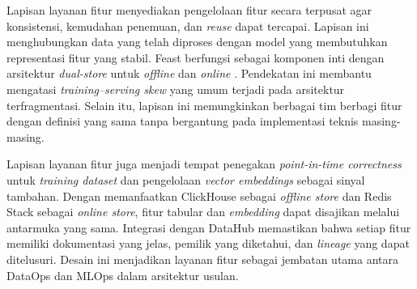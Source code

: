 Lapisan layanan fitur menyediakan pengelolaan fitur secara terpusat agar konsistensi, kemudahan penemuan, dan \textit{reuse} dapat tercapai. Lapisan ini menghubungkan data yang telah diproses dengan model yang membutuhkan representasi fitur yang stabil. Feast berfungsi sebagai komponen inti dengan arsitektur \textit{dual-store} untuk \textit{offline} dan \textit{online} \autocite{feast2024,munappy2022data}. Pendekatan ini membantu mengatasi \textit{training--serving skew} yang umum terjadi pada arsitektur terfragmentasi. Selain itu, lapisan ini memungkinkan berbagai tim berbagi fitur dengan definisi yang sama tanpa bergantung pada implementasi teknis masing-masing.

Lapisan layanan fitur juga menjadi tempat penegakan \textit{point-in-time correctness} untuk \textit{training dataset} dan pengelolaan \textit{vector embeddings} sebagai sinyal tambahan. Dengan memanfaatkan ClickHouse sebagai \textit{offline store} dan Redis Stack sebagai \textit{online store}, fitur tabular dan \textit{embedding} dapat disajikan melalui antarmuka yang sama. Integrasi dengan DataHub memastikan bahwa setiap fitur memiliki dokumentasi yang jelas, pemilik yang diketahui, dan \textit{lineage} yang dapat ditelusuri. Desain ini menjadikan layanan fitur sebagai jembatan utama antara DataOps dan MLOps dalam arsitektur usulan.

